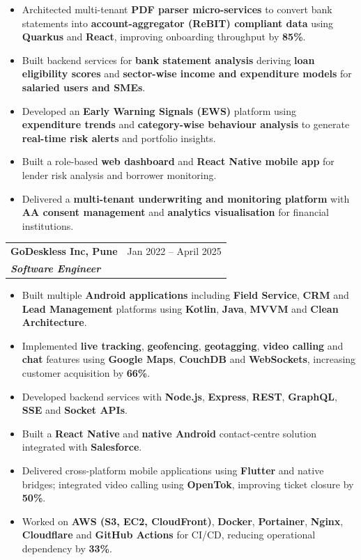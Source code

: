 \documentclass[a4paper,8pt]{article}
\begin{document}
\begin{itemize}[leftmargin=2em,itemsep=4pt]
\item Architected multi-tenant \textbf{PDF parser micro-services} to convert bank statements into \textbf{account-aggregator (ReBIT) compliant data} using \textbf{Quarkus} and \textbf{React}, improving onboarding throughput by \textbf{85\%}.
\item Built backend services for \textbf{bank statement analysis} deriving \textbf{loan eligibility scores} and \textbf{sector-wise income and expenditure models} for \textbf{salaried users and SMEs}.
\item Developed an \textbf{Early Warning Signals (EWS)} platform using \textbf{expenditure trends} and \textbf{category-wise behaviour analysis} to generate \textbf{real-time risk alerts} and portfolio insights.
\item Built a role-based \textbf{web dashboard} and \textbf{React Native mobile app} for lender risk analysis and borrower monitoring.
\item Delivered a \textbf{multi-tenant underwriting and monitoring platform} with \textbf{AA consent management} and \textbf{analytics visualisation} for financial institutions.
\end{itemize}

\vspace{6pt}

\begin{tabularx}{\linewidth}{@{} X r @{}}
\textbf{GoDeskless Inc, Pune} & \color[HTML]{371e77} Jan 2022 -- April 2025\\
\textit{\textbf{Software Engineer}} &
\end{tabularx}

\begin{itemize}[leftmargin=2em,itemsep=4pt]
\item Built multiple \textbf{Android applications} including \textbf{Field Service}, \textbf{CRM} and \textbf{Lead Management} platforms using \textbf{Kotlin}, \textbf{Java}, \textbf{MVVM} and \textbf{Clean Architecture}.
\item Implemented \textbf{live tracking}, \textbf{geofencing}, \textbf{geotagging}, \textbf{video calling} and \textbf{chat} features using \textbf{Google Maps}, \textbf{CouchDB} and \textbf{WebSockets}, increasing customer acquisition by \textbf{66\%}.
\item Developed backend services with \textbf{Node.js}, \textbf{Express}, \textbf{REST}, \textbf{GraphQL}, \textbf{SSE} and \textbf{Socket APIs}.
\item Built a \textbf{React Native} and \textbf{native Android} contact-centre solution integrated with \textbf{Salesforce}.
\item Delivered cross-platform mobile applications using \textbf{Flutter} and native bridges; integrated video calling using \textbf{OpenTok}, improving ticket closure by \textbf{50\%}.
\item Worked on \textbf{AWS (S3, EC2, CloudFront)}, \textbf{Docker}, \textbf{Portainer}, \textbf{Nginx}, \textbf{Cloudflare} and \textbf{GitHub Actions} for CI/CD, reducing operational dependency by \textbf{33\%}.
\end{itemize}
\end{document}
